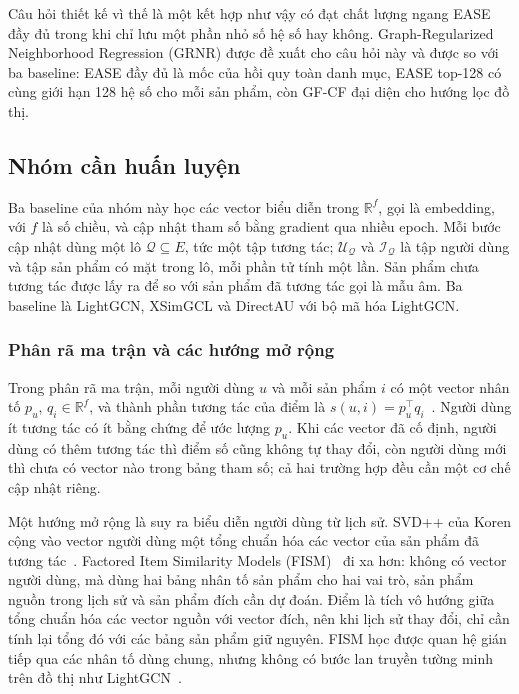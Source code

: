Câu hỏi thiết kế vì thế là một kết hợp như vậy có đạt chất lượng ngang EASE đầy đủ trong khi chỉ lưu một phần nhỏ số hệ số hay không. Graph-Regularized Neighborhood Regression (GRNR) được đề xuất cho câu hỏi này và được so với ba baseline: EASE đầy đủ là mốc của hồi quy toàn danh mục, EASE top-128 có cùng giới hạn 128 hệ số cho mỗi sản phẩm, còn GF-CF đại diện cho hướng lọc đồ thị.

\subsection{Nhóm cần huấn luyện}
\label{sec:trained-models}

Ba baseline của nhóm này học các vector biểu diễn trong $\mathbb{R}^{f}$, gọi là embedding, với $f$ là số chiều, và cập nhật tham số bằng gradient qua nhiều epoch. Mỗi bước cập nhật dùng một lô $\mathcal{Q}\subseteq E$, tức một tập tương tác; $\mathcal{U}_{\mathcal{Q}}$ và $\mathcal{I}_{\mathcal{Q}}$ là tập người dùng và tập sản phẩm có mặt trong lô, mỗi phần tử tính một lần. Sản phẩm chưa tương tác được lấy ra để so với sản phẩm đã tương tác gọi là mẫu âm. Ba baseline là LightGCN, XSimGCL và DirectAU với bộ mã hóa LightGCN.

\subsubsection{Phân rã ma trận và các hướng mở rộng}
\label{sec:mf-extensions}

Trong phân rã ma trận, mỗi người dùng $u$ và mỗi sản phẩm $i$ có một vector nhân tố $p_u$, $q_i\in\mathbb{R}^{f}$, và thành phần tương tác của điểm là $s(u,i)=p_u^\top q_i$~\cite{koren2009mf}. Người dùng ít tương tác có ít bằng chứng để ước lượng $p_u$. Khi các vector đã cố định, người dùng có thêm tương tác thì điểm số cũng không tự thay đổi, còn người dùng mới thì chưa có vector nào trong bảng tham số; cả hai trường hợp đều cần một cơ chế cập nhật riêng.

Một hướng mở rộng là suy ra biểu diễn người dùng từ lịch sử. SVD++ của Koren cộng vào vector người dùng một tổng chuẩn hóa các vector của sản phẩm đã tương tác~\cite{koren2008factorization}. Factored Item Similarity Models (FISM)~\cite{kabbur2013fism} đi xa hơn: không có vector người dùng, mà dùng hai bảng nhân tố sản phẩm cho hai vai trò, sản phẩm nguồn trong lịch sử và sản phẩm đích cần dự đoán. Điểm là tích vô hướng giữa tổng chuẩn hóa các vector nguồn với vector đích, nên khi lịch sử thay đổi, chỉ cần tính lại tổng đó với các bảng sản phẩm giữ nguyên. FISM học được quan hệ gián tiếp qua các nhân tố dùng chung, nhưng không có bước lan truyền tường minh trên đồ thị như LightGCN~\cite{kabbur2013fism}.

